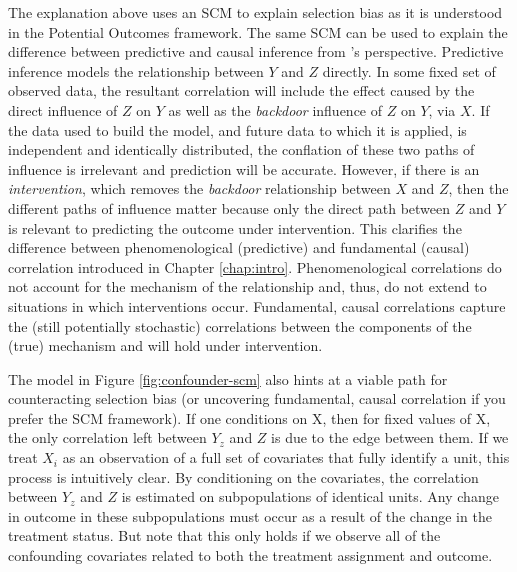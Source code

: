 \documentclass[../main.tex]{subfiles}
\begin{document}
\vspace{\baselineskip}

The explanation above uses an SCM to explain selection bias as it is understood in the Potential Outcomes framework. The same SCM can be used to explain the difference between predictive and causal inference from \textcite{Pearl2009CausalOverview}'s perspective. Predictive inference models the relationship between $Y$ and $Z$ directly. In some fixed set of observed data, the resultant correlation will include the effect caused by the direct influence of $Z$ on $Y$ as well as the \textit{backdoor} influence of $Z$ on $Y$, via $X$. If the data used to build the model, and future data to which it is applied, is independent and identically distributed, the conflation of these two paths of influence is irrelevant and prediction will be accurate. However, if there is an \textit{intervention}, which removes the \textit{backdoor} relationship between $X$ and $Z$, then the different paths of influence matter because only the direct path between $Z$ and $Y$ is relevant to predicting the outcome under intervention. This clarifies the difference between phenomenological (predictive) and fundamental (causal) correlation introduced in Chapter \ref{chap:intro}. Phenomenological correlations do not account for the mechanism of the relationship and, thus, do not extend to situations in which interventions occur. Fundamental, causal correlations capture the (still potentially stochastic) correlations between the components of the (true) mechanism and will hold under intervention.\par

\vspace{\baselineskip}

The model in Figure \ref{fig:confounder-scm} also hints at a viable path for counteracting selection bias (or uncovering fundamental, causal correlation if you prefer the SCM framework). If one conditions on X, then for fixed values of X, the only correlation left between  \( Y_{z} \) and  \( Z \)  is due to the edge between them. If we treat  \( X_{i} \) as an observation of a full set of covariates that fully identify a unit, this process is intuitively clear. By conditioning on the covariates, the correlation between  \( Y_{z} \) and  \( Z \) is estimated on subpopulations of identical units. Any change in outcome in these subpopulations must occur as a result of the change in the treatment status. But note that this only holds if we observe all of the confounding covariates related to both the treatment assignment and outcome.\par
\end{document}
